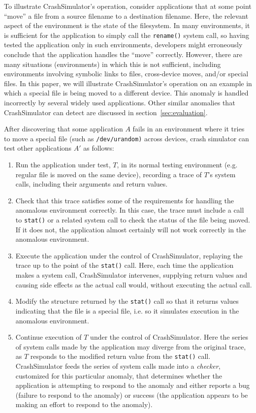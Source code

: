 To illustrate CrashSimulator's operation, consider applications that
at some point ``move'' a file from a source filename to a destination
filename.  Here, the relevant aspect of the environment is the state
of the filesystem.  In many environments, it is sufficient for the
application to simply call the {\tt rename()} system call, so having
tested the application only in such environments, developers might
erroneously conclude that the application handles the ``move''
correctly.  However, there are many situations (environments) in which
this is not sufficient, including environments involving symbolic
links to files, cross-device moves, and/or special files.  In this
paper, we will illustrate CrashSimulator's operation on an example in
which a special file is being moved to a different device.  This
anomaly is handled incorrectly by several widely used
applications. Other similar anomalies that CrashSimulator can detect
are discussed in section~\ref{sec:evaluation}.

After discovering that some application $A$ fails in an environment
where it tries to move a special file (such as {\tt /dev/urandom)}
across devices, crash simulator can test other applications $A'$ as
follows:
\begin{enumerate}
\item Run the application under test, $T$, in its normal testing environment (e.g. regular file is
  moved on the same device), recording a trace of $T$'s system calls,
  including their arguments and return values.
\item Check that this trace satisfies some of the requirements for
  handling the anomalous environment correctly. In this case, the
  trace must include a call to {\tt stat()} or a related system call
  to check the status of the file being moved. If it does not, the
  application almost certainly will not work correctly in the
  anomalous environment.
\item Execute the application under the control of CrashSimulator,
  replaying the trace up to the point of the {\tt stat()} call. Here,
  each time the application makes a system call, CrashSimulator
  intervenes, supplying return values and causing side effects as the
  actual call would, without executing the actual call.
\item Modify the structure returned by the {\tt stat()} call so that
  it returns values indicating that the file is a special file,
  i.e. so it simulates execution in the anomalous environment.
\item Continue execution of $T$ under the control of
  CrashSimulator. Here the series of system calls made by the
  application may diverge from the original trace, as $T$ responds to
  the modified return value from the {\tt stat()} call. CrashSimulator
  feeds the series of system calls made into a {\em checker},
  customized for this particular anomaly, that determines whether the
  application is attempting to respond to the anomaly and either
  reports a bug (failure to respond to the anomaly) or success (the
  application appears to be making an effort to respond to the
  anomaly).
\end{enumerate}

